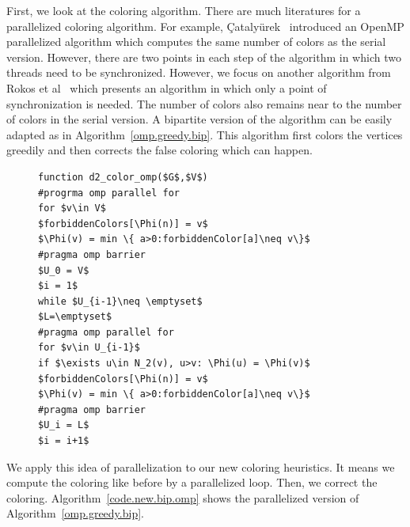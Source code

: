 \documentclass[12pt, twoside,a4paper,toc=bibliography]{scrbook}
\newcommand{\coderef}[1]{Algorithm~\protect\ref{#1}}
\begin{document}
First, we look at the coloring algorithm.
There are much literatures for a parallelized coloring algorithm.
For example,
{\c{C}}ataly{\"{u}}rek~\cite{cataly2012} introduced an OpenMP parallelized
algorithm which computes the same number of colors as the serial version.
However, there are two points in each step of the algorithm in which two threads
need to be synchronized.
However, we focus on another algorithm from Rokos et al~\cite{Rokos2015}
which presents an algorithm in which only a point of synchronization is
needed. The number of colors also remains near to the number of colors
in the serial version. A bipartite version of the algorithm can be easily
adapted as in \coderef{omp.greedy.bip}. This algorithm first colors the vertices
greedily and then corrects the false coloring which can happen.
\begin{figure}
\begin{lstlisting}[caption=A OpenMP parallelized version of greedy algorithm
adapted for the bipartite graph.,label=omp.greedy.bip,mathescape]
function d2_color_omp($G$,$V$)
#progrma omp parallel for
for $v\in V$
$forbiddenColors[\Phi(n)] = v$
$\Phi(v) = min \{ a>0:forbiddenColor[a]\neq v\}$
#pragma omp barrier
$U_0 = V$
$i = 1$
while $U_{i-1}\neq \emptyset$
$L=\emptyset$
#pragma omp parallel for
for $v\in U_{i-1}$
if $\exists u\in N_2(v), u>v: \Phi(u) = \Phi(v)$
$forbiddenColors[\Phi(n)] = v$
$\Phi(v) = min \{ a>0:forbiddenColor[a]\neq v\}$
#pragma omp barrier
$U_i = L$
$i = i+1$
\end{lstlisting}
\end{figure}
We apply this idea of parallelization to our new coloring heuristics.
It means we compute the coloring like before by a parallelized loop.
Then, we correct the coloring. \coderef{code.new.bip.omp} shows the parallelized
version of \coderef{omp.greedy.bip}.
\end{document}
